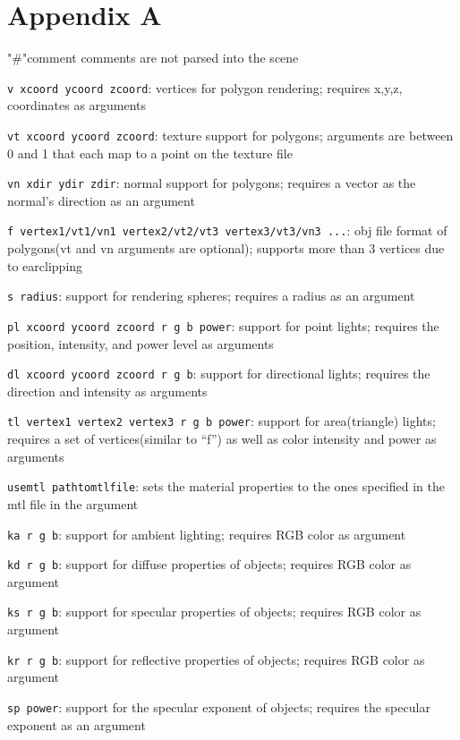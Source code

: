 \documentclass{article}
\begin{document}
	

\section*{Appendix A} %
\label{sec:appendixa}
"\#"comment
comments are not parsed into the scene

\verb+v xcoord ycoord zcoord+:
vertices for polygon rendering; requires x,y,z, coordinates as arguments

\verb+vt xcoord ycoord zcoord+:
texture support for polygons; arguments are between 0 and 1 that each map to a point on the texture file

\verb+vn xdir ydir zdir+:
normal support for polygons; requires a vector as the normal’s direction as an argument

\verb+f vertex1/vt1/vn1 vertex2/vt2/vt3 vertex3/vt3/vn3 ...+:
obj file format of polygons(vt and vn arguments are optional); supports more than 3 vertices due to earclipping

\verb+s radius+:
support for rendering spheres; requires a radius as an argument

\verb+pl xcoord ycoord zcoord r g b power+:
support for point lights; requires the position, intensity, and power level as arguments

\verb+dl xcoord ycoord zcoord r g b+:
support for directional lights; requires the direction and intensity as arguments

\verb+tl vertex1 vertex2 vertex3 r g b power+:
support for area(triangle) lights; requires a set of vertices(similar to “f”) as well as color intensity and power as arguments

\verb+usemtl pathtomtlfile+:
sets the material properties to the ones specified in the mtl file in the argument

\verb+ka r g b+:
support for ambient lighting; requires RGB color as argument

\verb+kd r g b+:
support for diffuse properties of objects; requires RGB color as argument

\verb+ks r g b+:
support for specular properties of objects; requires RGB color as argument

\verb+kr r g b+:
support for reflective properties of objects; requires RGB color as argument

\verb+sp power+:
support for the specular exponent of objects; requires the specular exponent as an argument
\end{document}
